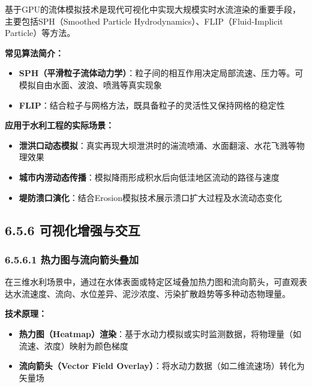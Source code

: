 基于GPU的流体模拟技术是现代可视化中实现大规模实时水流渲染的重要手段，主要包括SPH（Smoothed
Particle Hydrodynamics）、FLIP（Fluid-Implicit Particle）等方法。

\textbf{常见算法简介：}

\begin{itemize}
\tightlist
\item
  \textbf{SPH（平滑粒子流体动力学）}：粒子间的相互作用决定局部流速、压力等。可模拟自由水面、波浪、喷溅等真实现象
\item
  \textbf{FLIP}：结合粒子与网格方法，既具备粒子的灵活性又保持网格的稳定性
\end{itemize}

\textbf{应用于水利工程的实际场景：}

\begin{itemize}
\tightlist
\item
  \textbf{泄洪口动态模拟}：真实再现大坝泄洪时的湍流喷涌、水面翻滚、水花飞溅等物理效果
\item
  \textbf{城市内涝动态传播}：模拟降雨形成积水后向低洼地区流动的路径与速度
\item
  \textbf{堤防溃口演化}：结合Erosion模拟技术展示溃口扩大过程及水流动态变化
\end{itemize}

\subsection{6.5.6
可视化增强与交互}\label{ux53efux89c6ux5316ux589eux5f3aux4e0eux4ea4ux4e92}

\subsubsection{6.5.6.1
热力图与流向箭头叠加}\label{ux70edux529bux56feux4e0eux6d41ux5411ux7badux5934ux53e0ux52a0}

在三维水利场景中，通过在水体表面或特定区域叠加热力图和流向箭头，可直观表达水流速度、流向、水位差异、泥沙浓度、污染扩散趋势等多种动态物理量。

\textbf{技术原理：}

\begin{itemize}
\tightlist
\item
  \textbf{热力图（Heatmap）渲染}：基于水动力模拟或实时监测数据，将物理量（如流速、浓度）映射为颜色梯度
\item
  \textbf{流向箭头（Vector Field
  Overlay）}：将水动力数据（如二维流速场）转化为矢量场
\end{itemize}

